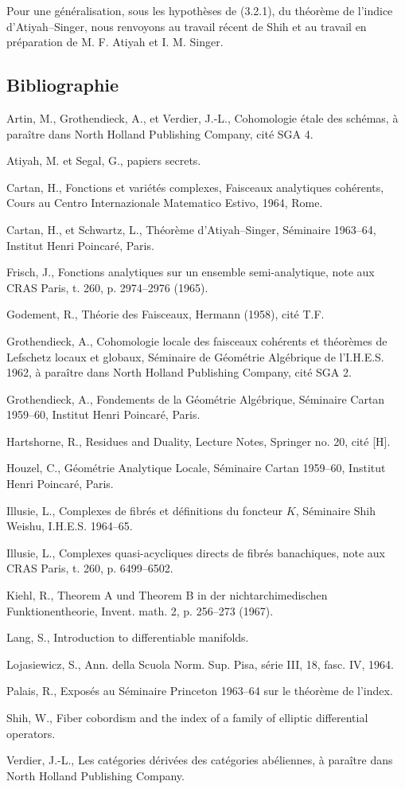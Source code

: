\documentclass[11pt]{article}
\begin{document}
Pour une généralisation, sous les hypothèses de (3.2.1), du théorème de l'indice d'Atiyah--Singer, nous renvoyons au travail récent de Shih et au travail en préparation de M. F. Atiyah et I. M. Singer.

\subsection*{Bibliographie}
\begin{enumerate}[label={[\arabic*]}]
\item Artin, M., Grothendieck, A., et Verdier, J.-L., Cohomologie étale des schémas, à paraître dans North Holland Publishing Company, cité SGA 4.
\item Atiyah, M. et Segal, G., papiers secrets.
\item Cartan, H., Fonctions et variétés complexes, Faisceaux analytiques cohérents, Cours au Centro Internazionale Matematico Estivo, 1964, Rome.
\item Cartan, H., et Schwartz, L., Théorème d'Atiyah--Singer, Séminaire 1963--64, Institut Henri Poincaré, Paris.
\item Frisch, J., Fonctions analytiques sur un ensemble semi-analytique, note aux CRAS Paris, t. 260, p. 2974--2976 (1965).
\item Godement, R., Théorie des Faisceaux, Hermann (1958), cité T.F.
\item Grothendieck, A., Cohomologie locale des faisceaux cohérents et théorèmes de Lefschetz locaux et globaux, Séminaire de Géométrie Algébrique de l'I.H.E.S. 1962, à paraître dans North Holland Publishing Company, cité SGA 2.
\item Grothendieck, A., Fondements de la Géométrie Algébrique, Séminaire Cartan 1959--60, Institut Henri Poincaré, Paris.
\item Hartshorne, R., Residues and Duality, Lecture Notes, Springer no. 20, cité [H].
\item Houzel, C., Géométrie Analytique Locale, Séminaire Cartan 1959--60, Institut Henri Poincaré, Paris.
\item Illusie, L., Complexes de fibrés et définitions du foncteur $K$, Séminaire Shih Weishu, I.H.E.S. 1964--65.
\item Illusie, L., Complexes quasi-acycliques directs de fibrés banachiques, note aux CRAS Paris, t. 260, p. 6499--6502.
\item Kiehl, R., Theorem A und Theorem B in der nichtarchimedischen Funktionentheorie, Invent. math. 2, p. 256--273 (1967).
\item Lang, S., Introduction to differentiable manifolds.
\item Lojasiewicz, S., Ann. della Scuola Norm. Sup. Pisa, série III, 18, fasc. IV, 1964.
\item Palais, R., Exposés au Séminaire Princeton 1963--64 sur le théorème de l'index.
\item Shih, W., Fiber cobordism and the index of a family of elliptic differential operators.
\item Verdier, J.-L., Les catégories dérivées des catégories abéliennes, à paraître dans North Holland Publishing Company.
\end{enumerate}
\end{document}
